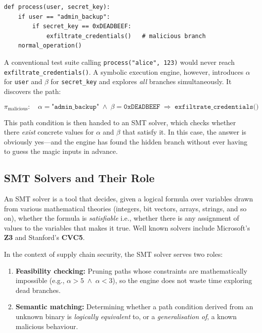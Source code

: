\begin{lstlisting}[caption={A simple function with a hidden condition}]
def process(user, secret_key):
    if user == "admin_backup":
        if secret_key == 0xDEADBEEF:
            exfiltrate_credentials()   # malicious branch
    normal_operation()
\end{lstlisting}
 
A conventional test suite calling \texttt{process("alice", 123)} would never reach \texttt{exfiltrate\_credentials()}. A symbolic execution engine, however, introduces $\alpha$ for \texttt{user} and $\beta$ for \texttt{secret\_key} and explores \textit{all} branches simultaneously. It discovers the path:
 
\[
    \pi_{\text{malicious}} : \quad \alpha = \texttt{"admin\_backup"} \;\wedge\; \beta = \texttt{0xDEADBEEF} \;\Rightarrow\; \texttt{exfiltrate\_credentials()}
\]
 
This path condition is then handed to an SMT solver, which checks whether there \textit{exist} concrete values for $\alpha$ and $\beta$ that satisfy it. In this case, the answer is obviously yes---and the engine has found the hidden branch without ever having to guess the magic inputs in advance.
 
\subsection{SMT Solvers and Their Role}
 
An SMT solver is a tool that decides, given a logical formula over variables drawn from various mathematical theories (integers, bit vectors, arrays, strings, and so on), whether the formula is \textit{satisfiable} i.e., whether there is any assignment of values to the variables that makes it true. Well known solvers include Microsoft's \textbf{Z3} and Stanford's \textbf{CVC5}.
 
In the context of supply chain security, the SMT solver serves two roles:
 
\begin{enumerate}
    \item \textbf{Feasibility checking:} Pruning paths whose constraints are mathematically impossible (e.g., $\alpha > 5 \;\wedge\; \alpha < 3$), so the engine does not waste time exploring dead branches.
    \item \textbf{Semantic matching:} Determining whether a path condition derived from an unknown binary is \textit{logically equivalent} to, or a \textit{generalisation of}, a known malicious behaviour.
\end{enumerate}
 
